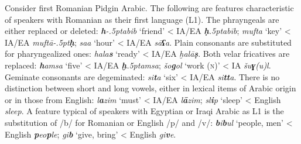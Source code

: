 \documentclass[output=paper]{langsci/langscibook}
\begin{document}
Consider first Romanian Pidgin Arabic. The following are features characteristic of speakers with Romanian as their first language (L1). The phrayngeals are either replaced or deleted: \textit{\textbf{h}\kern -.5ptabib} ‘friend’ < IA/EA \textit{\textbf{ḥ}\kern .5ptabīb}; \textit{mufta} ‘key’ < IA/EA \textit{muftā\kern -.5pt\textbf{ḥ}}; \textit{saa} ‘hour’ < IA/EA \textit{sā\textbf{ʕ}a}. Plain consonants are substituted for pharyngealized ones: \textit{hala\textbf{s}} ‘ready’ < IA/EA \textit{ḫalā\textbf{ṣ}}. Both velar fricatives are replaced: \textit{\textbf{h}amsa} ‘five’ < IA/EA \textit{\textbf{ḫ}\kern .5ptamsa}; \textit{šo\textbf{g}ol} ‘work (\textsc{n})’ < IA \textit{šu\textbf{ɣ}(u)l}. Geminate consonants are degeminated: \textit{si\textbf{t}a} ‘six’ < IA/EA \textit{si\textbf{tt}a}. There is no distinction between short and long vowels, either in lexical items of Arabic origin or in those from English: \textit{l\textbf{a}zim} ‘must’ < IA/EA \textit{l\textbf{ā}zim}; \textit{sl\textbf{i}p} ‘sleep’ < English \textit{sleep}. A feature typical of speakers with Egyptian or Iraqi Arabic as L1 is the substitution of /b/ for Romanian or English /p/ and /v/: \textit{\textbf{b}i\textbf{b}ul} ‘people, men’ < English \textit{\textbf{p}eo\textbf{p}le}; \textit{gi\textbf{b}} ‘give, bring’ < English \textit{gi\textbf{v}e}.
\end{document}
